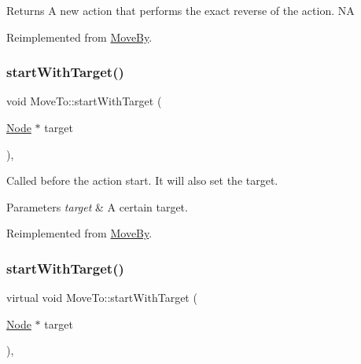 \begin{DoxyReturn}{Returns}
A new action that performs the exact reverse of the action.  NA 
\end{DoxyReturn}


Reimplemented from \hyperlink{classMoveBy_a3a29609f88b72d383c31e122693185f7}{Move\+By}.

\mbox{\label{classMoveTo_af9f86e7c5d391fe494cf6a597b839b13}} 
\subsubsection{\texorpdfstring{start\+With\+Target()}{startWithTarget()}\hspace{0.1cm}{\footnotesize\ttfamily [1/2]}}
{\footnotesize\ttfamily void Move\+To\+::start\+With\+Target (\begin{DoxyParamCaption}\item[{\hyperlink{classNode}{Node} $\ast$}]{target }\end{DoxyParamCaption})\hspace{0.3cm}{\ttfamily [override]}, {\ttfamily [virtual]}}

Called before the action start. It will also set the target.


\begin{DoxyParams}{Parameters}
{\em target} & A certain target. \\
\hline
\end{DoxyParams}


Reimplemented from \hyperlink{classMoveBy_ab83e2fe86e82757fa11cb734a4971a5f}{Move\+By}.

\mbox{\label{classMoveTo_a434fce91e656b8f239cef63938fb29a6}} 
\subsubsection{\texorpdfstring{start\+With\+Target()}{startWithTarget()}\hspace{0.1cm}{\footnotesize\ttfamily [2/2]}}
{\footnotesize\ttfamily virtual void Move\+To\+::start\+With\+Target (\begin{DoxyParamCaption}\item[{\hyperlink{classNode}{Node} $\ast$}]{target }\end{DoxyParamCaption})\hspace{0.3cm}{\ttfamily [override]}, {\ttfamily [virtual]}}

